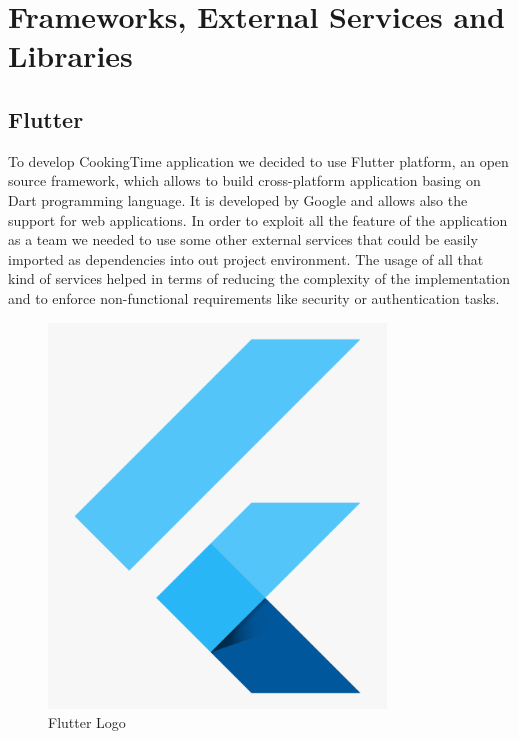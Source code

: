 \chapter{Frameworks, External Services and Libraries}

\section{Flutter}
To develop CookingTime application we decided to use Flutter platform, an open source framework, which allows to build cross-platform application basing on Dart programming language. It is developed by Google and allows also the support for web applications.
In order to exploit all the feature of the application as a team we needed to use some other external services that could be easily imported as dependencies into out project environment. 
The usage of all that kind of services helped in terms of reducing the complexity of the implementation and to enforce non-functional requirements like security or authentication tasks.
\begin{figure}[H]
		\begin{center}
			\centering
			\includegraphics[width=0.8\textwidth]{img/flutterLogo.png}
			\caption{Flutter Logo}
		\end{center}
	\end{figure}
